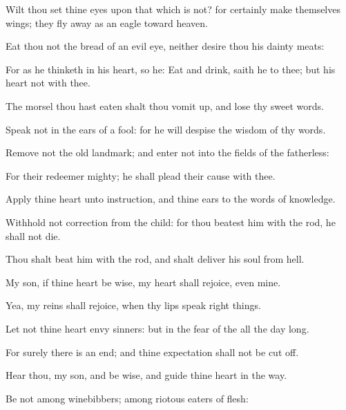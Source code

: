 {Wilt thou
set thine
eyes upon that which is not? for
{}
certainly
make themselves
wings; they fly
away as an
eagle toward
heaven.


\par }{\PP {}Eat thou not the
bread of
{} an
evil
eye, neither
desire thou his dainty
meats:

For as he
thinketh in his
heart, so
{} he:
Eat and
drink,
saith he to thee; but his
heart
{} not with thee.

The
morsel
{} thou hast
eaten shalt thou vomit
up, and
lose thy
sweet
words.

Speak not in the
ears of a
fool: for he will
despise the
wisdom of thy
words.


\par }{\PP {}Remove not the
old
landmark; and
enter not into the
fields of the
fatherless:

For their
redeemer
{}
mighty; he shall
plead their
cause with thee.


\par }{\PP {}Apply thine
heart unto
instruction, and thine
ears to the
words of
knowledge.

Withhold not
correction from the
child: for
{} thou
beatest him with the
rod, he shall not
die.

Thou shalt
beat him with the
rod, and shalt
deliver his
soul from
hell.

My
son, if thine
heart be
wise, my
heart shall
rejoice, even
mine.

Yea, my
reins shall
rejoice, when thy
lips
speak right
things.


\par }{\PP {}Let not thine
heart
envy
sinners: but
{} in the
fear of the
{} all the
day long.

For surely there
is an
end; and thine
expectation shall not be cut
off.


\par }{\PP {}Hear thou, my
son, and be
wise, and
guide thine
heart in the
way.

Be not among
winebibbers; among riotous
eaters of
flesh:

}
